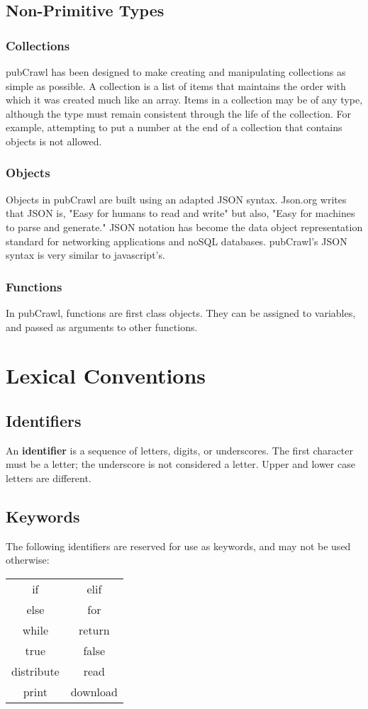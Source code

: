 \documentclass[oneside]{book}
\begin{document}
\section{Non-Primitive Types}

\subsection{Collections}
pubCrawl has been designed to make creating and manipulating collections as simple as possible. A collection is a list of items that maintains the order with which it was created much like an array. Items in a collection may be of any type, although the type must remain consistent through the life of the collection. For example, attempting to put a number at the end of a collection that contains objects is not allowed.

\subsection{Objects}
Objects in pubCrawl are built using an adapted JSON syntax. Json.org writes that JSON is, "Easy for humans to read and write" but also, "Easy for machines to parse and generate." JSON notation has become the data object representation standard for networking applications and noSQL databases. pubCrawl's JSON syntax is very similar to javascript's.

\subsection{Functions}
In pubCrawl, functions are first class objects. They can be assigned to variables, and passed as arguments to other functions.




\chapter{Lexical Conventions}
\section{Identifiers}
An \textbf{identifier} is a sequence of letters, digits, or underscores. The first character must be a letter; the underscore is not considered a letter. Upper and lower case letters are different.
\section{Keywords}
The following identifiers are reserved for use as keywords, and may not be used otherwise:\\
\begin{center}
  \begin{tabular}{c c}
  if&elif\\
  else&for\\
  while&return\\
  true&false\\
  distribute&read\\
  print&download
  \end{tabular}
\end{center}
\end{document}
